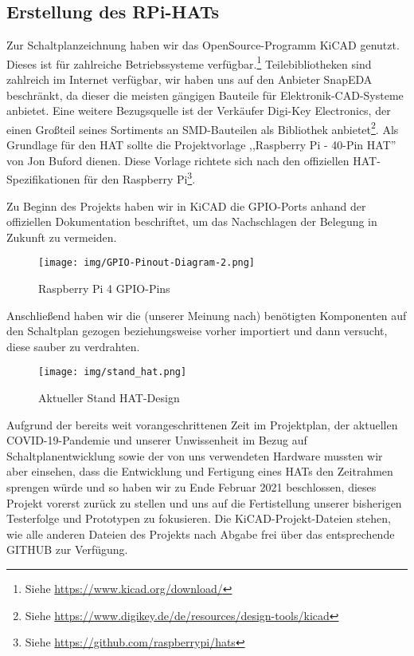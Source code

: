 \subsection{Erstellung des RPi-HATs}\label{hw_hat}
Zur Schaltplanzeichnung haben wir das OpenSource-Programm KiCAD genutzt. Dieses ist für zahlreiche Betriebssysteme verfügbar.\footnote{Siehe \url{https://www.kicad.org/download/}} Teilebibliotheken sind zahlreich im Internet verfügbar, wir haben uns auf den Anbieter SnapEDA beschränkt, da dieser die meisten gängigen Bauteile für Elektronik-CAD-Systeme anbietet. Eine weitere Bezugsquelle ist der Verkäufer Digi-Key Electronics, der einen Großteil seines Sortiments an SMD-Bauteilen als Bibliothek anbietet\footnote{Siehe \url{https://www.digikey.de/de/resources/design-tools/kicad}}. Als Grundlage für den HAT sollte die Projektvorlage ,,Raspberry Pi - 40-Pin HAT'' von Jon Buford dienen. Diese Vorlage richtete sich nach den offiziellen HAT-Spezifikationen für den Raspberry Pi\footnote{Siehe \url{https://github.com/raspberrypi/hats}}.\par
Zu Beginn des Projekts haben wir in KiCAD die GPIO-Ports anhand der offiziellen Dokumentation beschriftet, um das Nachschlagen der Belegung in Zukunft zu vermeiden.
\begin{figure}[h!tb]
	\texttt{[image: img/GPIO-Pinout-Diagram-2.png]}
	\caption[Raspberry Pi 4 GPIO-Pins]{Raspberry Pi 4 GPIO-Pins}
	\label{rpi-gpio-pins}
\end{figure}
\par
Anschließend haben wir die (unserer Meinung nach) benötigten Komponenten auf den Schaltplan gezogen beziehungsweise vorher importiert und dann versucht, diese sauber zu verdrahten.\par
\begin{figure}[h!tb]
	\texttt{[image: img/stand\_hat.png]}
	\caption[Aktueller Stand HAT-Design]{Aktueller Stand HAT-Design}
	\label{hat-design}
\end{figure}
Aufgrund der bereits weit vorangeschrittenen Zeit im Projektplan, der aktuellen COVID-19-Pandemie und unserer Unwissenheit im Bezug auf Schaltplanentwicklung sowie der von uns verwendeten Hardware mussten wir aber einsehen, dass die Entwicklung und Fertigung eines HATs den Zeitrahmen sprengen würde und so haben wir zu Ende Februar 2021 beschlossen, dieses Projekt vorerst zurück zu stellen und uns auf die Fertistellung unserer bisherigen Testerfolge und Prototypen zu fokusieren. Die KiCAD-Projekt-Dateien stehen, wie alle anderen Dateien des Projekts nach Abgabe frei über das entsprechende GITHUB zur Verfügung.\par